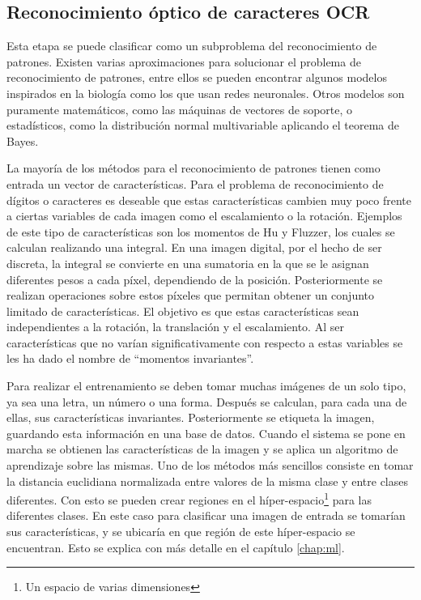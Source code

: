 \documentclass[a4paper, 11pt, oneside]{report}
\begin{document}
\subsection{Reconocimiento óptico de caracteres OCR}

Esta etapa se puede clasificar como un subproblema del reconocimiento de patrones. Existen varias aproximaciones para solucionar el problema de reconocimiento de patrones, entre ellos se pueden encontrar algunos modelos inspirados en la biología como los que usan redes neuronales. Otros modelos son puramente matemáticos, como las máquinas de vectores de soporte, o estadísticos, como la distribución normal multivariable aplicando el teorema de Bayes.

La  mayoría de los métodos para el reconocimiento de patrones tienen como entrada un vector de características. Para el problema de reconocimiento de dígitos o caracteres es deseable que estas características cambien muy poco frente a ciertas variables de cada imagen como el escalamiento o la rotación. Ejemplos de este tipo de características son los momentos de Hu y Fluzzer, los cuales se calculan realizando una integral. En una imagen digital, por el hecho de ser discreta, la integral se convierte en una sumatoria en la que se le asignan diferentes pesos a cada píxel, dependiendo de la posición. Posteriormente se realizan operaciones sobre estos píxeles que permitan obtener un conjunto limitado de características. El objetivo es que estas características sean independientes a la rotación, la translación y el escalamiento. Al ser características que no varían significativamente con respecto a estas variables se les ha dado el nombre de ``momentos invariantes''.

Para realizar el entrenamiento se deben tomar muchas imágenes de un solo tipo, ya sea una letra, un número o una forma. Después se calculan, para cada una de ellas, sus características invariantes. Posteriormente se etiqueta la imagen, guardando esta información en una base de datos. Cuando el sistema se pone en marcha se obtienen las características de la imagen y se aplica un algoritmo de aprendizaje sobre las mismas. Uno de los métodos más sencillos consiste en tomar la distancia euclidiana normalizada entre valores de la misma clase y entre clases diferentes. Con esto se pueden crear regiones en el híper-espacio\footnote{Un espacio de varias dimensiones} para las diferentes clases. En este caso para clasificar una imagen de entrada se tomarían sus características, y se ubicaría en que región de este híper-espacio se encuentran. Esto se explica con más detalle en el capítulo \ref{chap:ml}.
    
\end{document}
